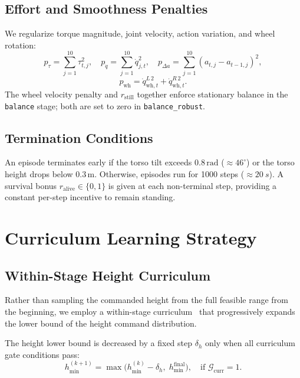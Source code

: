 \documentclass[conference]{IEEEtran}
\begin{document}
\subsection{Effort and Smoothness Penalties}
We regularize torque magnitude, joint velocity, action variation,
and wheel rotation:
\begin{equation}
p_\tau = \sum_{j=1}^{10} \tau_{t,j}^2,
\quad
p_{\dot{q}} = \sum_{j=1}^{10} \dot{q}_{j,t}^2,
\quad
p_{\Delta a} = \sum_{j=1}^{10}(a_{t,j} - a_{t-1,j})^2,
\end{equation}
\begin{equation}
p_{\mathrm{wh}} = \dot{q}_{\mathrm{wh},t}^{L\,2} + \dot{q}_{\mathrm{wh},t}^{R\,2}.
\end{equation}
The wheel velocity penalty and $r_{\mathrm{still}}$ together enforce
stationary balance in the \texttt{balance} stage;
both are set to zero in \texttt{balance\_robust}.

\subsection{Termination Conditions}
An episode terminates early if the torso tilt exceeds $0.8\,\mathrm{rad}$
($\approx 46^\circ$) or the torso height drops below $0.3\,\mathrm{m}$.
Otherwise, episodes run for 1000 steps ($\approx\SI{20}{s}$).
A survival bonus $r_{\mathrm{alive}} \in \{0, 1\}$ is given at each
non-terminal step, providing a constant per-step incentive to remain standing.

\section{Curriculum Learning Strategy}
\label{sec:curriculum}

\subsection{Within-Stage Height Curriculum}
Rather than sampling the commanded height from the full feasible range
from the beginning, we employ a within-stage curriculum~\cite{bengio2009curriculum}
that progressively expands the lower bound of the height command distribution.

The height lower bound is decreased by a fixed step $\delta_h$ only when
all curriculum gate conditions pass:
\begin{equation}
h_{\min}^{(k+1)} = \max\!\big(h_{\min}^{(k)} - \delta_h,\;
h_{\min}^{\mathrm{final}}\big),
\quad
\text{if } \mathcal{G}_{\mathrm{curr}} = 1.
\label{eq:height_curriculum}
\end{equation}
\end{document}
